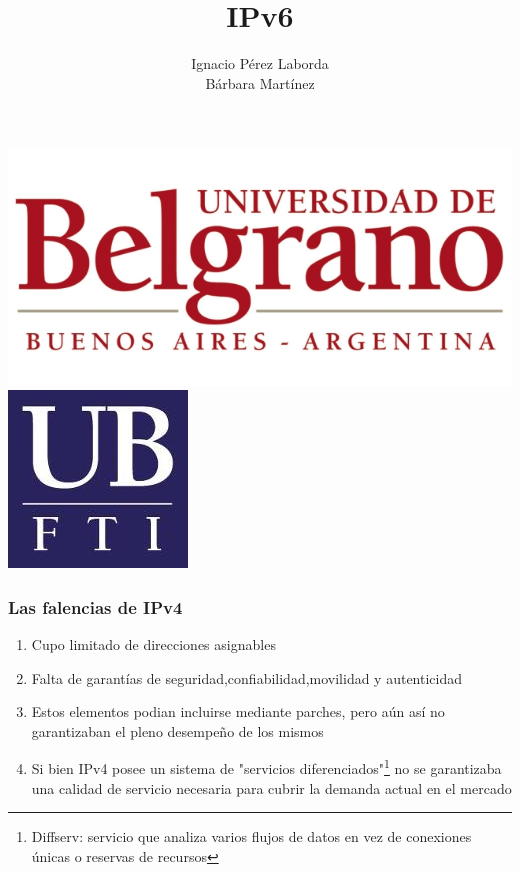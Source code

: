 \documentclass{beamer}
\title[Tecnologia]
{IPv6}
\subtitle{}
\author[Grupo 1] 
{Ignacio P\'erez Laborda\\B\'arbara Mart\'inez}
\institute[UB--FTI] 
{
  Facultad de Tecnolog\'ia Inform\'atica\\
  Universidad de Belgrano
}
\date[\today]
\begin{document}
\begin{frame}

\includegraphics[height=0.2\textheight]{ub2.jpg} \hspace*{6cm}
\includegraphics[height=0.19\textheight]{FTI.jpg}  
\\[-0.1cm]
\titlepage


\end{frame}

\begin{frame}
\frametitle{Las falencias de IPv4}

\begin{enumerate}[$*$]

	\item Cupo limitado de direcciones asignables
	\item Falta de garant\'ias de seguridad,confiabilidad,movilidad y autenticidad
	\item Estos elementos podian incluirse mediante parches, pero a\'un as\'i no garantizaban el pleno desempeño de los mismos
	\item Si bien IPv4 posee un sistema de "servicios diferenciados"\footnote[1]{Diffserv: servicio que analiza varios flujos de datos en vez de conexiones únicas o reservas de recursos } no se garantizaba una calidad de servicio necesaria para cubrir la demanda actual en el mercado
\end{enumerate}

\end{frame}
\end{document}
